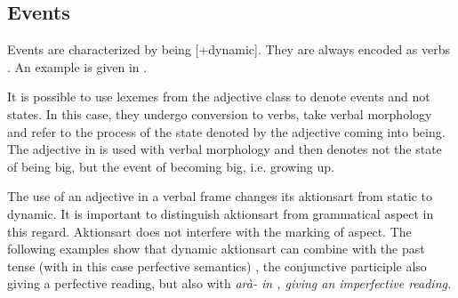\subsection{Events}\label{sec:func:Events}
Events are characterized by being [+dynamic]. They  are always encoded as verbs . An example is given in .


It is possible to use lexemes from the adjective class to denote events and not states. In this case, they undergo conversion to verbs, take verbal morphology and refer to  the process of the state denoted by the adjective coming into being. The adjective  in  is used with verbal morphology and then denotes not the state of being big, but the event of becoming big, i.e. growing up.


The use of an adjective in a verbal frame changes its aktionsart from static to dynamic. It is important to distinguish aktionsart from grammatical aspect in this regard. Aktionsart  does not interfere with the marking of aspect. The following examples show that dynamic aktionsart can combine with the past tense (with in this case perfective semantics) , the conjunctive participle  also giving a perfective reading, but also with \em arà- \em in , giving an imperfective reading.




